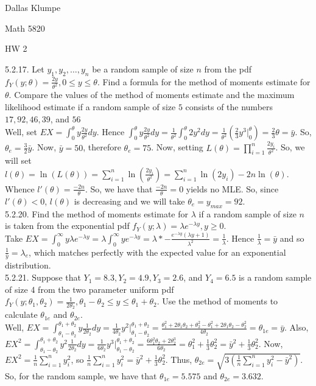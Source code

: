 \documentclass[12pt]{article}
\begin{document}
\noindent Dallas Klumpe

\noindent Math 5820

\noindent HW 2

5.2.17. Let $y_1, y_2,\dots, y_n$ be a random sample of size $n$ from the pdf $f_Y (y;\theta)=\frac{2y}{\theta^2}, 0\leq y\leq\theta$. Find a formula for the method of moments estimate for $\theta$. Compare the values of the method of moments estimate and the maximum likelihood estimate if a random sample of size $5$ consists of the numbers $17, 92, 46, 39$, and $56$\\
Well, set $EX=\int_0^{\theta}y\frac{2y}{\theta^2}dy$. Hence $\int_0^{\theta}y\frac{2y}{\theta^2}dy=\frac{1}{\theta^2}\int_0^{\theta}2y^2dy=\frac{1}{\theta^2}(\frac23y^3|_0^\theta)=\frac23\theta=\bar{y}$. So, $\theta_e=\frac32\bar{y}$. Now, $\bar{y}=50$, therefore $\theta_e=75$. Now, setting $L(\theta)=\prod_{i=1}^n\frac{2y_i}{\theta^2}$. So, we will set $l(\theta)=\ln(L(\theta))=\sum_{i=1}^n\ln(\frac{2y_i}{\theta^2})=\sum_{i=1}^n\ln(2y_i)-2n\ln(\theta)$. Whence $l'(\theta)=\frac{-2n}{\theta}$. So, we have that $\frac{-2n}{\theta}=0$ yields no MLE. So, since $l'(\theta)<0$, $l(\theta)$ is decreasing and we will take $\theta_e=y_{max}=92$.\\[20pt]

5.2.20. Find the method of moments estimate for $\lambda$ if a random sample of size $n$ is taken from the exponential pdf $f_Y(y;\lambda)=\lambda e^{-\lambda y}, y\geq0$.\\
Take $EX=\int_0^{\infty}y\lambda e^{-\lambda y}=\lambda\int_0^{\infty}ye^{-\lambda y}=\lambda*-\frac{e^{-\lambda y}(\lambda y+1)}{\lambda^2}=\frac{1}{\lambda}$. Hence $\frac{1}{\lambda}=\bar{y}$ and so $\frac{1}{\bar{y}}=\lambda_e$, which matches perfectly with the expected value for an exponential distribution.\\[20pt]

5.2.21. Suppose that $Y_1 = 8.3, Y_2 = 4.9, Y_3 = 2.6$, and $Y_4 = 6.5$ is a random sample of size 4 from the two parameter uniform pdf $f_Y(y; \theta_1, \theta_2)=\frac{1}{2\theta_2}, \theta_1-\theta_2\leq y\leq\theta_1+\theta_2$. Use the method of moments to calculate $\theta_{1e}$ and $\theta_{2e}$.\\
Well, $EX=\int_{\theta_1-\theta_2}^{\theta_1+\theta_2}y\frac{1}{2\theta_2}dy=\frac{1}{4\theta_2}y^2|_{\theta_1-\theta_2}^{\theta_1+\theta_2}=\frac{\theta_1^2+2\theta_1\theta_2+\theta_2^2-\theta_1^2+2\theta_1\theta_2-\theta_2^2}{4\theta_2}=\theta_{1e}=\bar{y}$. Also, $EX^2=\int_{\theta_1-\theta_2}^{\theta_1+\theta_2}y^2\frac{1}{2\theta_2}dy=\frac{1}{6\theta_2}y^3|_{\theta_1-\theta_2}^{\theta_1+\theta_2}=\frac{6\theta_1^2\theta_2+2\theta_2^3}{6\theta_2}=\theta_1^2+\frac13\theta_2^2=\bar{y}^2+\frac13\theta_2^2$. Now, $EX^2=\frac1n\sum_{i=1}^ny_i^2$, so $\frac1n\sum_{i=1}^ny_i^2=\bar{y}^2+\frac13\theta_2^2$. Thus, $\theta_{2e}=\sqrt{3(\frac1n\sum_{i=1}^ny_i^2-\bar{y}^2)}$. So, for the random sample, we have that $\theta_{1e}=5.575$ and $\theta_{2e}=3.632$.\\[20pt]
\end{document}
